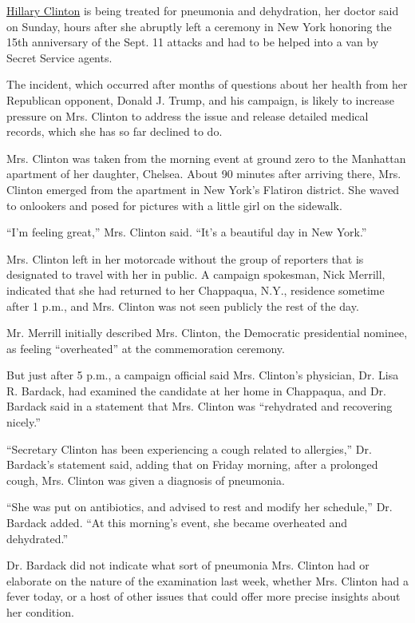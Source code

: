 \href{http://www.nytimes3xbfgragh.onion/interactive/2016/us/elections/hillary-clinton-on-the-issues.html?inline=nyt-per}{Hillary
Clinton} is being treated for pneumonia and dehydration, her doctor said
on Sunday, hours after she abruptly left a ceremony in New York honoring
the 15th anniversary of the Sept. 11 attacks and had to be helped into a
van by Secret Service agents.

The incident, which occurred after months of questions about her health
from her Republican opponent, Donald J. Trump, and his campaign, is
likely to increase pressure on Mrs. Clinton to address the issue and
release detailed medical records, which she has so far declined to do.

Mrs. Clinton was taken from the morning event at ground zero to the
Manhattan apartment of her daughter, Chelsea. About 90 minutes after
arriving there, Mrs. Clinton emerged from the apartment in New York's
Flatiron district. She waved to onlookers and posed for pictures with a
little girl on the sidewalk.

``I'm feeling great,'' Mrs. Clinton said. ``It's a beautiful day in New
York.''

Mrs. Clinton left in her motorcade without the group of reporters that
is designated to travel with her in public. A campaign spokesman, Nick
Merrill, indicated that she had returned to her Chappaqua, N.Y.,
residence sometime after 1 p.m., and Mrs. Clinton was not seen publicly
the rest of the day.

Mr. Merrill initially described Mrs. Clinton, the Democratic
presidential nominee, as feeling ``overheated'' at the commemoration
ceremony.

But just after 5 p.m., a campaign official said Mrs. Clinton's
physician, Dr. Lisa R. Bardack, had examined the candidate at her home
in Chappaqua, and Dr. Bardack said in a statement that Mrs. Clinton was
``rehydrated and recovering nicely.''

``Secretary Clinton has been experiencing a cough related to
allergies,'' Dr. Bardack's statement said, adding that on Friday
morning, after a prolonged cough, Mrs. Clinton was given a diagnosis of
pneumonia.

``She was put on antibiotics, and advised to rest and modify her
schedule,'' Dr. Bardack added. ``At this morning's event, she became
overheated and dehydrated.''

Dr. Bardack did not indicate what sort of pneumonia Mrs. Clinton had or
elaborate on the nature of the examination last week, whether Mrs.
Clinton had a fever today, or a host of other issues that could offer
more precise insights about her condition.

